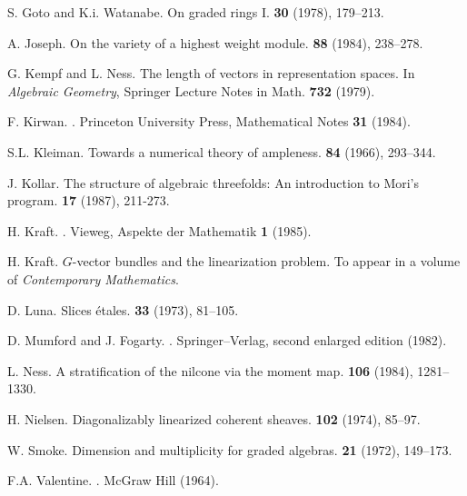 \documentclass{article}
\theoremstyle{plain}
\theoremstyle{definition}
\begin{document}
\begin{thebibliography}{25}
  {\sc S. Goto and K.i. Watanabe.}
  \newblock On graded rings I.
   \textbf{30} (1978), 179--213.

  {\sc A. Joseph.}
  \newblock On the variety of a highest weight module.
   \textbf{88} (1984), 238--278.

  {\sc G. Kempf and L. Ness.}
  \newblock The length of vectors in representation spaces.
  \newblock In {\em Algebraic Geometry}, Springer Lecture Notes in Math. \textbf{732} (1979).

  {\sc F. Kirwan.}
  .
  \newblock Princeton University Press, Mathematical Notes \textbf{31} (1984).

  {\sc S.L. Kleiman.}
  \newblock Towards a numerical theory of ampleness.
   \textbf{84} (1966), 293--344.

  {\sc J. Kollar.}
  \newblock The structure of algebraic threefolds: An introduction to Mori's program.
   \textbf{17} (1987), 211-273.

  {\sc H. Kraft.}
  .
  \newblock Vieweg, Aspekte der Mathematik \textbf{1} (1985).

  {\sc H. Kraft.}
  \newblock $G$-vector bundles and the linearization problem.
  \newblock To appear in a volume of {\em Contemporary Mathematics}.

  {\sc D. Luna.}
  \newblock Slices \'{e}tales.
   \textbf{33} (1973), 81--105.

  {\sc D. Mumford and J. Fogarty.}
  .
  \newblock Springer--Verlag, second enlarged edition (1982).

  {\sc L. Ness.}
  \newblock A stratification of the nilcone via the moment map.
   \textbf{106} (1984), 1281--1330.

  {\sc H. Nielsen.}
  \newblock Diagonalizably linearized coherent sheaves.
   \textbf{102} (1974), 85--97.

  {\sc W. Smoke.}
  \newblock Dimension and multiplicity for graded algebras.
   \textbf{21} (1972), 149--173.

  {\sc F.A. Valentine.}
  .
  \newblock McGraw Hill (1964).

\end{thebibliography}
\end{document}
